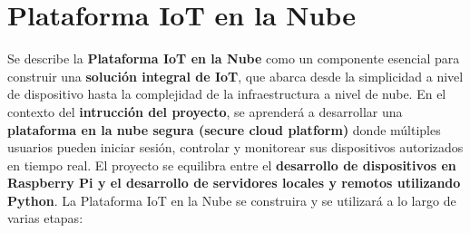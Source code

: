 \documentclass{report}
\begin{document}
\section{Plataforma IoT en la Nube}
Se describe la \textbf{Plataforma IoT en la Nube} como un componente esencial para construir una \textbf{solución integral de IoT}, 
que abarca desde la simplicidad a nivel de dispositivo hasta la complejidad de la infraestructura a nivel de nube. En el contexto del 
\textbf{intrucción del proyecto}, se aprenderá a desarrollar una \textbf{plataforma en la nube segura (secure cloud platform)} donde 
múltiples usuarios pueden iniciar sesión, controlar y monitorear sus dispositivos autorizados en tiempo real. 
El proyecto se equilibra entre el \textbf{desarrollo de dispositivos en Raspberry Pi y el desarrollo de servidores locales y remotos 
utilizando Python}. 
La Plataforma IoT en la Nube se construira y se utilizará a lo largo de varias etapas:
\end{document}
